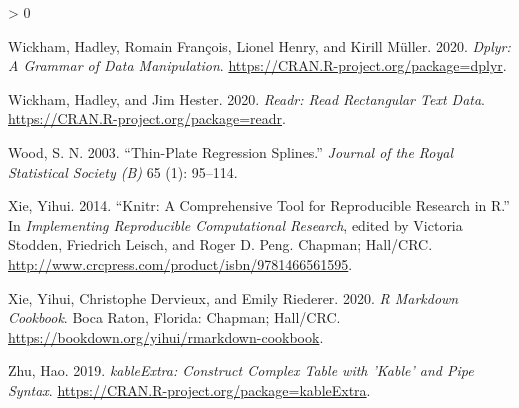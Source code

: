 \documentclass{article}
\newlength{\cslhangindent}
\newenvironment{CSLReferences}[2] %
 {%
  \setlength{\parindent}{0pt}
  \ifodd #1 \everypar{\setlength{\hangindent}{\cslhangindent}}\ignorespaces\fi
  \ifnum #2 > 0
  \setlength{\parskip}{#2\baselineskip}
  \fi
 }%
 {}
\begin{document}
\begin{CSLReferences}{1}{0}
\leavevmode\hypertarget{ref-dplyr}{}%
Wickham, Hadley, Romain François, Lionel Henry, and Kirill Müller. 2020. \emph{Dplyr: A Grammar of Data Manipulation}. \url{https://CRAN.R-project.org/package=dplyr}.

\leavevmode\hypertarget{ref-readr}{}%
Wickham, Hadley, and Jim Hester. 2020. \emph{Readr: Read Rectangular Text Data}. \url{https://CRAN.R-project.org/package=readr}.

\leavevmode\hypertarget{ref-mgcv}{}%
Wood, S. N. 2003. {``Thin-Plate Regression Splines.''} \emph{Journal of the Royal Statistical Society (B)} 65 (1): 95--114.

\leavevmode\hypertarget{ref-knitr}{}%
Xie, Yihui. 2014. {``Knitr: A Comprehensive Tool for Reproducible Research in {R}.''} In \emph{Implementing Reproducible Computational Research}, edited by Victoria Stodden, Friedrich Leisch, and Roger D. Peng. Chapman; Hall/CRC. \url{http://www.crcpress.com/product/isbn/9781466561595}.

\leavevmode\hypertarget{ref-rmarkdown}{}%
Xie, Yihui, Christophe Dervieux, and Emily Riederer. 2020. \emph{R Markdown Cookbook}. Boca Raton, Florida: Chapman; Hall/CRC. \url{https://bookdown.org/yihui/rmarkdown-cookbook}.

\leavevmode\hypertarget{ref-kableExtra}{}%
Zhu, Hao. 2019. \emph{kableExtra: Construct Complex Table with 'Kable' and Pipe Syntax}. \url{https://CRAN.R-project.org/package=kableExtra}.

\end{CSLReferences}



\end{document}
